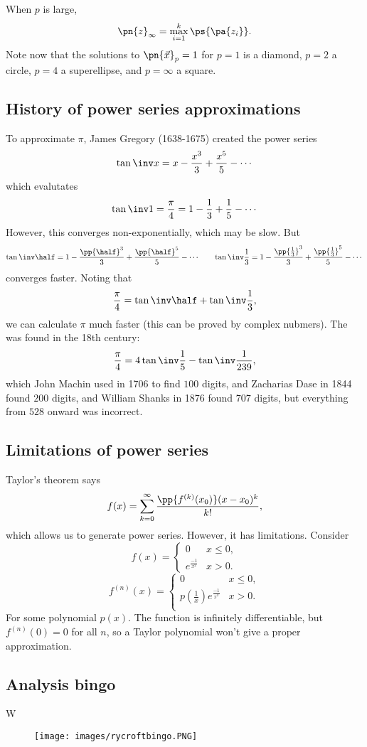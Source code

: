 \documentclass[11pt]{scrartcl}
\numberwithin{equation}{section}
\begin{document}
When $p$ is large, \[ \pn{z}_\infty = \max_{i=1}^k 
\ps{\pa{z_i}}. \]
Note now that the solutions to $\pn{\vec{x}}_p=1$ for $p=1$ is a diamond, 
$p=2$ a circle, $p=4$ a superellipse, and $p=\infty$ a square. 

\subsection{History of power series approximations}
To approximate $\pi$, 
James Gregory (1638-1675) created the power series 
\[\tan\inv x = x-\frac{x^3}{3}+\frac{x^5}{5}-\cdots\]
which evalutates
\[\tan\inv 1 =\frac{\pi}{4}= 1-\frac{1}{3}+\frac{1}{5}-\cdots \] 
However, this converges non-exponentially, which may be slow. But 
\[\tan\inv \half = 1-\frac{\pp{\half}^3}{3}+\frac{\pp{\half}^5}{5}-\cdots \qquad \tan\inv \frac{1}{3} = 1-\frac{\pp{\frac{1}{3}}^3}{3}+\frac{\pp{\frac{1}{3}}^5}{5}-\cdots \]
converges faster. Noting that 
\[\frac{\pi}{4}= \tan\inv \half + \tan\inv \frac{1}{3}, \]
we can calculate $\pi$ much faster (this can be proved by complex 
nubmers).
The  was found in the 18th century: 
\[ \frac{\pi}{4}=4\tan\inv\frac{1}{5}-\tan\inv\frac{1}{239},\]
which John Machin used in 1706 to find $100$ digits,
and Zacharias Dase in 1844 found $200$ digits,
and William Shanks in 1876 found $707$ digits, but everything from $528$
onward was incorrect.

\subsection{Limitations of power series}
Taylor's theorem says 
\[
    f(x)= \sum_{k=0}^{\infty}\frac{\pp{f^{(k)}(x_0)}(x-x_0)^k}{k!},
\]
which allows us to generate power series.
However, it has limitations. Consider 
\[
    f(x) = \begin{cases}
        0 &x\leq 0,\\
        e^{\frac{-1}{x^2}} &x>0.
    \end{cases}
\]
\[
    f^{(n)}(x) = \begin{cases}
        0 &x\leq 0,\\
        p(\frac{1}{x})e^{\frac{-1}{x^2}} &x>0. \\
    \end{cases}
\]
For some polynomial $p(x)$.
The function is infinitely differentiable, but $f^{(n)}(0)=0$ for all $n$,
so a Taylor polynomial won't give a proper approximation.

\subsection{Analysis bingo}
W
\begin{figure}[h]
    \centering
    \texttt{[image: images/rycroftbingo.PNG]}
\end{figure}
\end{document}
